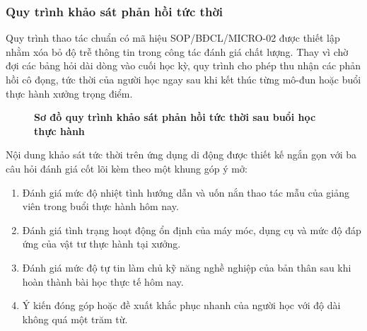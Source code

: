 \subsubsection{Quy trình khảo sát phản hồi tức thời}

Quy trình thao tác chuẩn có mã hiệu SOP/BĐCL/MICRO-02 được thiết lập nhằm xóa bỏ độ trễ thông tin trong công tác đánh giá chất lượng. Thay vì chờ đợi các bảng hỏi dài dòng vào cuối học kỳ, quy trình cho phép thu nhận các phản hồi cô đọng, tức thời của người học ngay sau khi kết thúc từng mô-đun hoặc buổi thực hành xưởng trọng điểm.

\begin{figure}[htbp]
\centering
\small
{}
\caption{\textbf{Sơ đồ quy trình khảo sát phản hồi tức thời sau buổi học thực hành}}
\end{figure}

Nội dung khảo sát tức thời trên ứng dụng di động được thiết kế ngắn gọn với ba câu hỏi đánh giá cốt lõi kèm theo một khung góp ý mở:
\begin{enumerate}
    \item Đánh giá mức độ nhiệt tình hướng dẫn và uốn nắn thao tác mẫu của giảng viên trong buổi thực hành hôm nay.
    \item Đánh giá tình trạng hoạt động ổn định của máy móc, dụng cụ và mức độ đáp ứng của vật tư thực hành tại xưởng.
    \item Đánh giá mức độ tự tin làm chủ kỹ năng nghề nghiệp của bản thân sau khi hoàn thành bài học thực tế hôm nay.
    \item Ý kiến đóng góp hoặc đề xuất khắc phục nhanh của người học với độ dài không quá một trăm từ.
\end{enumerate}

